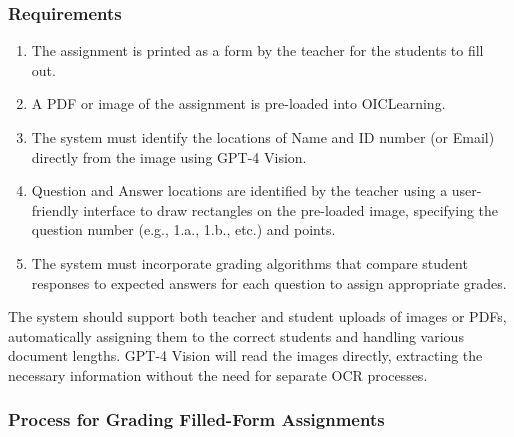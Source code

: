 \documentclass[ms,twoside,print]{nuthesis}
\begin{document}
\subsubsection{Requirements}

\begin{enumerate}
    \item The assignment is printed as a form by the teacher for the students to fill out.
    \item A PDF or image of the assignment is pre-loaded into OICLearning.
    \item The system must identify the locations of Name and ID number (or Email) directly from the image using GPT-4 Vision.
    \item Question and Answer locations are identified by the teacher using a user-friendly interface to draw rectangles on the pre-loaded image, specifying the question number (e.g., 1.a., 1.b., etc.) and points.
    \item The system must incorporate grading algorithms that compare student responses to expected answers for each question to assign appropriate grades.
\end{enumerate}

The system should support both teacher and student uploads of images or PDFs, automatically assigning them to the correct students and handling various document lengths. GPT-4 Vision will read the images directly, extracting the necessary information without the need for separate OCR processes.

\subsubsection{Process for Grading Filled-Form Assignments}
\end{document}

